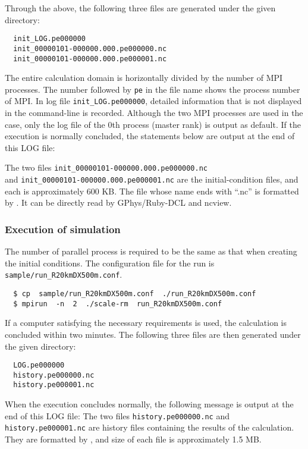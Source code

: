 
Through the above, the following three files are generated under the given directory:
\begin{verbatim}
  init_LOG.pe000000
  init_00000101-000000.000.pe000000.nc
  init_00000101-000000.000.pe000001.nc
\end{verbatim}
The entire calculation domain is horizontally divided by the number of MPI processes.
The number followed by \verb|pe| in the file name shows the process number of MPI.
In log file \verb|init_LOG.pe000000|,
detailed information that is not displayed in the command-line is recorded.
Although the two MPI processes are used in the case,
only the log file of the 0th process (master rank) is output as default.
If the execution is normally concluded, the statements below are output at the end of this LOG file:


The two files
\verb|init_00000101-000000.000.pe000000.nc|\\ and \verb|init_00000101-000000.000.pe000001.nc| are the initial-condition files, and each is approximately 600 KB.
The file whose name ends with ``.nc''  is formatted by \netcdf.
It can be directly read by GPhys/Ruby-DCL and ncview.


\subsubsection{Execution of simulation} %

The number of parallel process is required to be the same as that when creating the initial conditions.
The configuration file for the run is \verb|sample/run_R20kmDX500m.conf|.
\begin{verbatim}
  $ cp  sample/run_R20kmDX500m.conf  ./run_R20kmDX500m.conf
  $ mpirun  -n  2  ./scale-rm  run_R20kmDX500m.conf
\end{verbatim}

If a computer satisfying the necessary requirements is used,
the calculation is concluded within two minutes.
The following three files are then generated under the given directory:
\begin{verbatim}
  LOG.pe000000
  history.pe000000.nc
  history.pe000001.nc
\end{verbatim}
When the execution concludes normally,
the following message is output at the end of this LOG file:
The two files \verb|history.pe000000.nc| and \verb|history.pe000001.nc| are history files containing the results of the calculation. They are formatted by \netcdf, and size of each file is approximately 1.5 MB.
